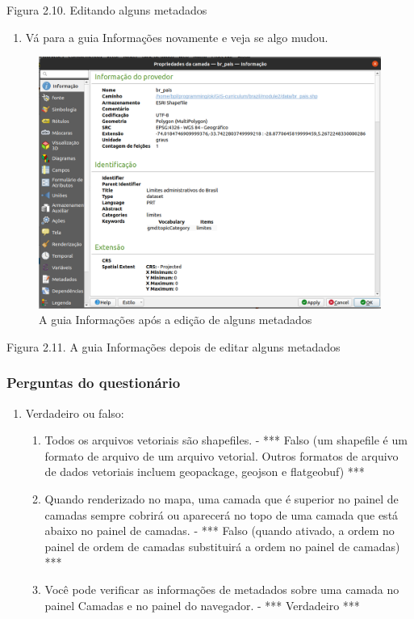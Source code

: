 \documentclass[
]{book}
\providecommand{\tightlist}{%
  \setlength{\itemsep}{0pt}\setlength{\parskip}{0pt}}
\begin{document}
Figura 2.10. Editando alguns metadados

\begin{enumerate}
\def\labelenumi{\arabic{enumi}.}
\setcounter{enumi}{3}
\tightlist
\item
  Vá para a guia Informações novamente e veja se algo mudou.
\end{enumerate}

\begin{figure}
\centering
\includegraphics{media/modulo2/metadata-3.png}
\caption{A guia Informações após a edição de alguns metadados}
\end{figure}

Figura 2.11. A guia Informações depois de editar alguns metadados

\hypertarget{perguntas-do-questionuxe1rio-5}{%
\subsubsection{Perguntas do questionário}\label{perguntas-do-questionuxe1rio-5}}

\begin{enumerate}
\def\labelenumi{\arabic{enumi}.}
\item
  Verdadeiro ou falso:

  \begin{enumerate}
  \def\labelenumii{\arabic{enumii}.}
  \tightlist
  \item
    Todos os arquivos vetoriais são shapefiles. - *** Falso (um shapefile é um formato de arquivo de um arquivo vetorial. Outros formatos de arquivo de dados vetoriais incluem geopackage, geojson e flatgeobuf) ***
  \item
    Quando renderizado no mapa, uma camada que é superior no painel de camadas sempre cobrirá ou aparecerá no topo de uma camada que está abaixo no painel de camadas. - *** Falso (quando ativado, a ordem no painel de ordem de camadas substituirá a ordem no painel de camadas) ***
  \item
    Você pode verificar as informações de metadados sobre uma camada no painel Camadas e no painel do navegador. - *** Verdadeiro ***
  \end{enumerate}
\end{enumerate}
\end{document}
